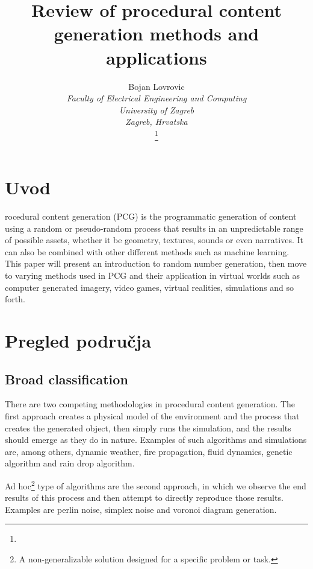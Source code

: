 \documentclass[journal]{IEEEtran}
\begin{document}
\title{Review of procedural content generation methods and applications}

\author{
Bojan Lovrovic\\
\textit{Faculty of Electrical Engineering and Computing}\\
\textit{University of Zagreb}\\
\textit{Zagreb, Hrvatska}

\thanks{}
}

\maketitle

\section{Uvod}
rocedural content generation (PCG) is the programmatic generation of content using a random or pseudo-random process that results in an unpredictable range of possible assets, whether it be geometry, textures, sounds or even narratives. It can also be combined with other different methods such as machine learning. This paper will present an introduction to random number generation, then move to varying methods used in PCG and their application in virtual worlds such as computer generated imagery, video games, virtual realities, simulations and so forth.

\section{Pregled područja}
\subsection{Broad classification}
There are two competing methodologies in procedural content generation. The first approach creates a physical model of the environment and the process that creates the generated object, then simply runs the simulation, and the results should emerge as they do in nature. Examples of such algorithms and simulations are, among others, dynamic weather, fire propagation, fluid dynamics, genetic algorithm and rain drop algorithm.
\par
Ad hoc\footnote{A non-generalizable solution designed for a specific problem or task.} type of algorithms are the second approach, in which we observe the end results of this process and then attempt to directly reproduce those results. Examples are perlin noise, simplex noise and voronoi diagram generation.
\end{document}
